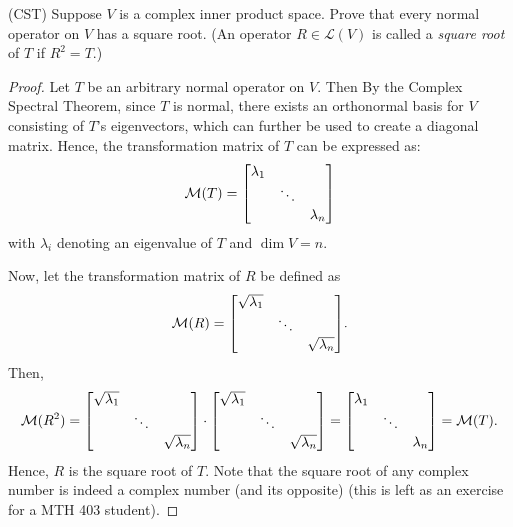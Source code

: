 (CST) Suppose $V$ is a complex inner product space. Prove that every normal operator on $V$ has a square root. (An operator $R \in \mathcal{L}(V)$ is called a \emph{square root} of $T$ if $R^2 = T$.)

\begin{proof}
    Let $T$ be an arbitrary normal operator on $V$. Then By the Complex Spectral Theorem, since $T$ is normal, there exists an orthonormal basis for $V$ consisting of $T$'s eigenvectors, which can further be used to create a diagonal matrix. Hence, the transformation matrix of $T$ can be expressed as:
    $$\mathcal M(T) = \mqty[\dmat{\lambda_1}{\ddots}{\lambda_n}]$$
    with $\lambda_i$ denoting an eigenvalue of $T$ and $\dim V = n$.

    \nl Now, let the transformation matrix of $R$ be defined as
    $$\mathcal M(R) = \mqty[\dmat{\sqrt{\lambda_1}}{\ddots}{\sqrt{\lambda_n}}].$$
    Then,
    $$\mathcal M(R^2) = \mqty[\dmat{\sqrt{\lambda_1}}{\ddots}{\sqrt{\lambda_n}}] \cdot \mqty[\dmat{\sqrt{\lambda_1}}{\ddots}{\sqrt{\lambda_n}}] = \mqty[\dmat{\lambda_1}{\ddots}{\lambda_n}] = \mathcal M(T).$$
    Hence, $R$ is the square root of $T$. Note that the square root of any complex number is indeed a complex number (and its opposite) (this is left as an exercise for a MTH 403 student).
\end{proof}